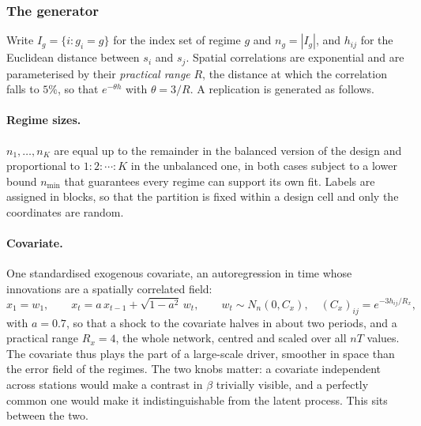 \subsubsection{The generator}\label{sec3:generator}

Write $I_g = \{i : g_i = g\}$ for the index set of regime $g$ and $n_g = |I_g|$, and $h_{ij}$ for the Euclidean distance between $s_i$ and $s_j$. Spatial correlations are exponential and are parameterised by their \emph{practical range} $R$, the distance at which the correlation falls to $5\%$, so that $e^{-\theta h}$ with $\theta = 3/R$. A replication is generated as follows.

\paragraph{Regime sizes.} $n_1,\dots,n_K$ are equal up to the remainder in the balanced version of the design and proportional to $1:2:\cdots:K$ in the unbalanced one, in both cases subject to a lower bound $n_{\min}$ that guarantees every regime can support its own fit. Labels are assigned in blocks, so that the partition is fixed within a design cell and only the coordinates are random.

\paragraph{Covariate.} One standardised exogenous covariate, an autoregression in time whose innovations are a spatially correlated field:
\begin{equation}
  x_1 = w_1, \qquad
  x_t = a\,x_{t-1} + \sqrt{1-a^2}\,w_t, \qquad
  w_t \sim N_n(0, C_x), \quad (C_x)_{ij} = e^{-3 h_{ij}/R_x},
  \label{eq:dgpcov}
\end{equation}
with $a = 0.7$, so that a shock to the covariate halves in about two periods, and a practical range $R_x = 4$, the whole network, centred and scaled over all $nT$ values. The covariate thus plays the part of a large-scale driver, smoother in space than the error field of the regimes. The two knobs matter: a covariate independent across stations would make a contrast in $\beta$ trivially visible, and a perfectly common one would make it indistinguishable from the latent process. This sits between the two.

